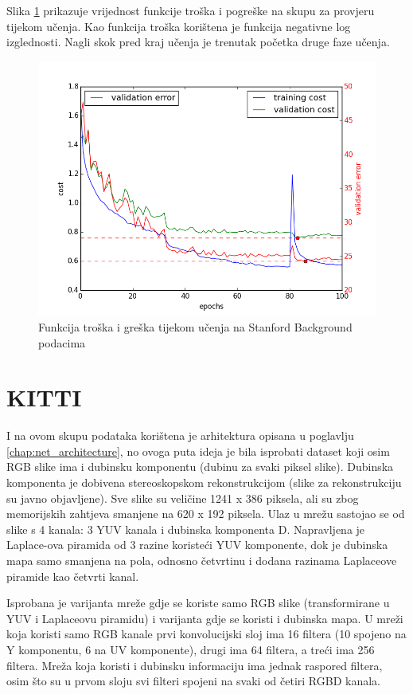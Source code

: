 \documentclass[times, utf8, diplomski, numeric]{fer}
\begin{document}
Slika \ref{fig:iccv_train} prikazuje vrijednost funkcije troška i pogreške na skupu za provjeru tijekom učenja. Kao funkcija troška korištena je funkcija negativne log izglednosti. Nagli skok pred kraj učenja je trenutak početka druge faze učenja.

\begin{figure}[htb]
  \centering
  \includegraphics[width=\textwidth]{imgs/cost-iccv.png}
  \caption{Funkcija troška i greška tijekom učenja na Stanford Background podacima}
  \label{fig:iccv_train}
\end{figure}

\section{KITTI}

I na ovom skupu podataka korištena je arhitektura opisana u poglavlju \ref{chap:net_architecture}, no ovoga puta ideja je bila isprobati dataset koji osim RGB slike ima i dubinsku komponentu (dubinu za svaki piksel slike). Dubinska komponenta je dobivena stereoskopskom rekonstrukcijom (slike za rekonstrukciju su javno objavljene). Sve slike su veličine 1241 x 386 piksela, ali su zbog memorijskih zahtjeva smanjene na 620 x 192 piksela. Ulaz u mrežu sastojao se od slike s 4 kanala: 3 YUV kanala i dubinska komponenta D. Napravljena je Laplace-ova piramida od 3 razine koristeći YUV komponente, dok je dubinska mapa samo smanjena na pola, odnosno četvrtinu i dodana razinama Laplaceove piramide kao četvrti kanal.

Isprobana je varijanta mreže gdje se koriste samo RGB slike (transformirane u YUV i Laplaceovu piramidu) i varijanta gdje se koristi i dubinska mapa. U mreži koja koristi samo RGB kanale prvi konvolucijski sloj ima 16 filtera (10 spojeno na Y komponentu, 6 na UV komponente), drugi ima 64 filtera, a treći ima 256 filtera.
Mreža koja koristi i dubinsku informaciju ima jednak raspored filtera, osim što su u prvom sloju svi filteri spojeni na svaki od četiri RGBD kanala.
\end{document}
